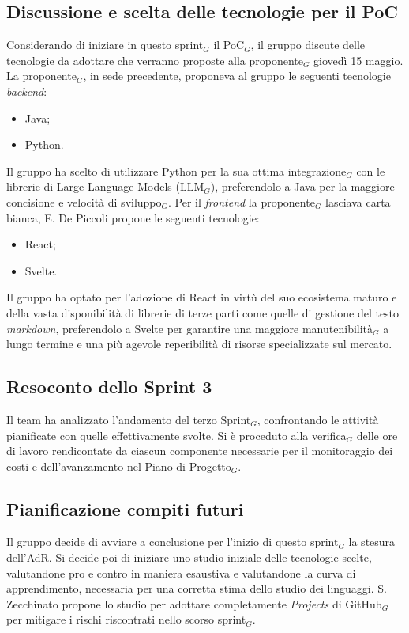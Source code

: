 \documentclass[a4paper, 10pt, colorlinks=true, linkcolor=black, urlcolor=blue, citecolor=blue, hidelinks]{article}
\begin{document}
\subsection{Discussione e scelta delle tecnologie per il PoC}
Considerando di iniziare in questo sprint$_G$ il PoC$_G$, il gruppo discute delle tecnologie da adottare che verranno proposte alla proponente$_G$ giovedì 15 maggio. La proponente$_G$, in sede precedente, proponeva al gruppo le seguenti tecnologie \textit{backend}:
\begin{itemize}
    \item Java;
    \item Python.
\end{itemize}
Il gruppo ha scelto di utilizzare Python per la sua ottima integrazione$_G$ con le librerie di Large Language Models (LLM$_G$), preferendolo a Java per la maggiore concisione e velocità di sviluppo$_G$. Per il \textit{frontend} la proponente$_G$ lasciava carta bianca, E. De Piccoli propone le seguenti tecnologie:
\begin{itemize}
    \item React;
    \item Svelte.
\end{itemize}
Il gruppo ha optato per l'adozione di React in virtù del suo ecosistema maturo e della vasta disponibilità di librerie di terze parti come quelle di gestione del testo \textit{markdown}, preferendolo a Svelte per garantire una maggiore manutenibilità$_G$ a lungo termine e una più agevole reperibilità di risorse specializzate sul mercato.

\subsection{Resoconto dello Sprint 3}
Il team ha analizzato l'andamento del terzo Sprint$_G$, confrontando le attività pianificate con quelle effettivamente svolte. Si è proceduto alla verifica$_G$ delle ore di lavoro rendicontate da ciascun componente necessarie per il monitoraggio dei costi e dell'avanzamento nel Piano di Progetto$_G$.

\subsection{Pianificazione compiti futuri}
Il gruppo decide di avviare a conclusione per l'inizio di questo sprint$_G$ la stesura dell'AdR. Si decide poi di iniziare uno studio iniziale delle tecnologie scelte, valutandone pro e contro in maniera esaustiva e valutandone la curva di apprendimento, necessaria per una corretta stima dello studio dei linguaggi.
S. Zecchinato propone lo studio per adottare completamente \textit{Projects} di GitHub$_G$ per mitigare i rischi riscontrati nello scorso sprint$_G$.
\end{document}
